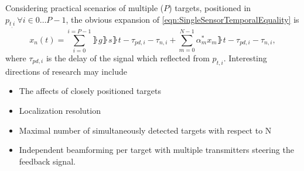 Considering practical scenarios of multiple ($P$) targets, positioned in $p_{t_,i}\ \forall i\in0\dots{}P-1$, the obvious expansion of \eqref{eqn:SingleSensorTemporalEquality} is 
\begin{equation}
    \label{eqn:ftr_dyn_temp}
    x_{n}(t) = \sum_{i=0}^{i=P-1}{\rBrace{g\rBrace{s\rBrace{t-\tau_{pd,i}-\tau_{n,i}}
    +\sum_{m=0}^{N-1}{\alpha^{*}_{m}x_{m}\rBrace{t-\tau_{pd,i}-\tau_{n,i}}}}}},
\end{equation}
where $\tau_{pd,i}$ is the delay of the signal which reflected from $p_{t,i}$.
Interesting directions of research may include
\begin{itemize}
    \item The affects of closely positioned targets
    \item Localization resolution
    \item Maximal number of simultaneously detected targets with respect to N
    \item Independent beamforming per target with multiple transmitters steering the feedback signal. 
\end{itemize}